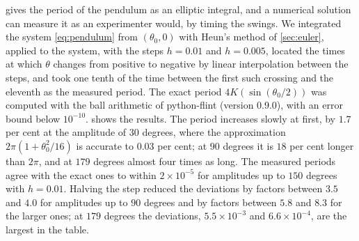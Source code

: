  gives the period of the pendulum as an elliptic integral, and a numerical solution can measure it as an experimenter would, by timing the swings. We integrated the system \eqref{eq:pendulum} from $(\theta_0,0)$ with Heun's method of \cref{sec:euler}, applied to the system, with the steps $h=0.01$ and $h=0.005$, located the times at which $\theta$ changes from positive to negative by linear interpolation between the steps, and took one tenth of the time between the first such crossing and the eleventh as the measured period. The exact period $4K(\sin(\theta_0/2))$ was computed with the ball arithmetic of python-flint (version 0.9.0), with an error bound below $10^{-10}$.  shows the results. The period increases slowly at first, by $1.7$ per cent at the amplitude of $30$ degrees, where the approximation $2\pi(1+\theta_0^2/16)$ is accurate to $0.03$ per cent; at $90$ degrees it is $18$ per cent longer than $2\pi$, and at $179$ degrees almost four times as long. The measured periods agree with the exact ones to within $2\times10^{-5}$ for amplitudes up to $150$ degrees with $h=0.01$. Halving the step reduced the deviations by factors between $3.5$ and $4.0$ for amplitudes up to $90$ degrees and by factors between $5.8$ and $8.3$ for the larger ones; at $179$ degrees the deviations, $5.5\times10^{-3}$ and $6.6\times10^{-4}$, are the largest in the table.

\begin{table}
\end{table}

